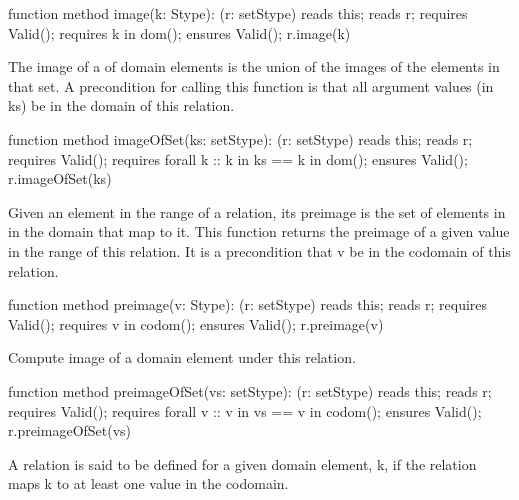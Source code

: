\documentclass[letterpaper,10pt,english]{sphinxmanual}
\begin{document}
\begin{sphinxVerbatim}[commandchars=\\\{\}]
function method image(k: Stype): (r: set\PYGZlt{}Stype\PYGZgt{})
    reads this;
    reads r;
    requires Valid();
    requires k in dom();
    ensures Valid();
\PYGZob{}
    r.image(k)
\PYGZcb{}
\end{sphinxVerbatim}

The image of a  of domain elements is the union of the images of
the elements in that set. A precondition for calling this function is
that all argument values (in ks) be in the domain of this relation.

\begin{sphinxVerbatim}[commandchars=\\\{\}]
function method imageOfSet(ks: set\PYGZlt{}Stype\PYGZgt{}): (r: set\PYGZlt{}Stype\PYGZgt{})
    reads this;
    reads r;
    requires Valid();
    requires forall k :: k in ks ==\PYGZgt{} k in dom();
    ensures Valid();
\PYGZob{}
    r.imageOfSet(ks)
\PYGZcb{}
\end{sphinxVerbatim}

Given an element in the range of a relation, its preimage is the set
of elements in in the domain that map to it. This function returns the
preimage of a given value in the range of this relation. It is a
precondition that v be in the codomain of this relation.

\begin{sphinxVerbatim}[commandchars=\\\{\}]
function method preimage(v: Stype): (r: set\PYGZlt{}Stype\PYGZgt{})
    reads this;
    reads r;
    requires Valid();
    requires v in codom();
    ensures Valid();
\PYGZob{}
    r.preimage(v)
\PYGZcb{}
\end{sphinxVerbatim}

Compute image of a domain element under this relation.

\begin{sphinxVerbatim}[commandchars=\\\{\}]
function method preimageOfSet(vs: set\PYGZlt{}Stype\PYGZgt{}): (r: set\PYGZlt{}Stype\PYGZgt{})
    reads this;
    reads r;
    requires Valid();
    requires forall v :: v in vs ==\PYGZgt{} v in codom();
    ensures Valid();
\PYGZob{}
    r.preimageOfSet(vs)
\PYGZcb{}
\end{sphinxVerbatim}

A relation is said to be defined for a given domain element, k, if the
relation maps k to at least one value in the codomain.
\end{document}
